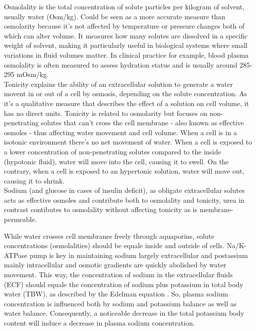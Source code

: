 Osmolality is the total concentration of solute particles per kilogram of solvent, usually water (Osm/kg).
\newline Could be seen as a more accurate measure than osmolarity because it’s not affected by temperature or pressure changes both of which can alter volume. It measures how many solutes are dissolved in a specific weight of solvent, making it particularly useful in biological systems where small variations in fluid volumes matter. In clinical practice for example, blood plasma osmolality is often measured to assess hydration status and is usually around 285-295 mOsm/kg.\\

Tonicity explains the ability of an extracellular solution to generate a water movent in or out of a cell by osmosis, depending on the solute concentration. As it’s a qualitative measure that describes the effect of a solution on cell volume, it has no direct units. 
\newline Tonicity is related to osmolarity but focuses on non-penetrating solutes that can’t cross the cell membrane - also known as effective osmoles - thus affecting water movement and cell volume. When a cell is in a isotonic environment there’s no net movement of water. When a cell is exposed to a lower concentration of non-penetrating solutes compared to the inside (hypotonic fluid), water will move into the cell, causing it to swell. On the contrary, when a cell is exposed to an hypertonic solution, water will move out, causing it to shrink.\\

Sodium (and glucose in cases of insulin deficit), as obligate extracellular solutes acts as effective osmoles and contribute both to osmolality and tonicity, urea in contrast contibutes to osmolality without affecting tonicity as is membrane-permeable.

While water crosses cell membranes freely through aquaporins, solute concentrations (osmolalities) should be equale inside and outside of cells. Na/K-ATPase pump is key in maintaining sodium largely extracellular and postassium mainly intracellular and osmotic gradients are quickly abolished by water movement. This way, the concentration of sodium in the extracellular fluids (ECF) should equale the concentration of sodium plus potassium in total body water (TBW), as described by the Edelman equation \cite{sternsDisordersPlasmaSodium2015a}. So, plasma sodium concentration is influenced both by sodium and potassium balance as well as water balance. Consequently, a noticeable decrease in the total potassium body content will induce a decrease in plasma sodium concentration.	\\

